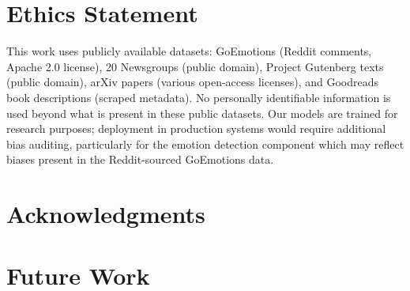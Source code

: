 \documentclass[11pt]{article}
\begin{document}
\section*{Ethics Statement}

This work uses publicly available datasets: GoEmotions (Reddit comments, Apache 2.0 license), 20 Newsgroups (public domain), Project Gutenberg texts (public domain), arXiv papers (various open-access licenses), and Goodreads book descriptions (scraped metadata). No personally identifiable information is used beyond what is present in these public datasets. Our models are trained for research purposes; deployment in production systems would require additional bias auditing, particularly for the emotion detection component which may reflect biases present in the Reddit-sourced GoEmotions data.

\section*{Acknowledgments}





\appendix

\section{Future Work}
\label{sec:future_work}
\end{document}
